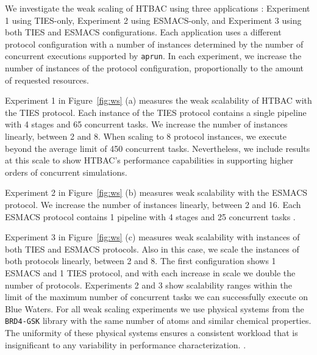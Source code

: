 We investigate the weak scaling of HTBAC using three
applications : Experiment 
1 using TIES-only, Experiment 2 using ESMACS-only, and Experiment 3 using
both TIES and ESMACS configurations. Each application uses a different protocol 
configuration with a number of instances determined by the 
number of concurrent executions supported by \texttt{aprun}. In each experiment, 
we increase the number of instances of the protocol configuration, 
proportionally to the amount of requested resources. 

Experiment 1 in Figure~\ref{fig:ws} (a) measures the weak scalability of HTBAC 
with the TIES protocol. Each instance of the TIES protocol contains a single 
pipeline with 4 stages and 65 concurrent tasks. We increase the number of 
instances linearly, between 2 and 8. When scaling to 8 protocol instances, we 
execute beyond the average limit of 450 concurrent tasks. 
Nevertheless, we include results at this scale to show HTBAC's performance 
capabilities in supporting higher orders of concurrent simulations. 

Experiment 2 in Figure~\ref{fig:ws} (b) measures weak scalability with the 
ESMACS protocol. We increase the number of instances linearly, between 2 and 16. 
Each ESMACS protocol contains 1 pipeline with 4 stages and 25
concurrent tasks . 

Experiment 3 in Figure~\ref{fig:ws} (c) measures weak scalability
with instances of both TIES and ESMACS protocols. Also in this case, we scale
the instances of both protocols linearly, between 2 and 8. The first 
configuration shows 1 ESMACS and 1 TIES protocol, and with each increase in 
scale we double the number of protocols. Experiments 2 and 3 
show scalability ranges within the limit of the maximum number of concurrent 
tasks we can successfully execute on Blue Waters. For all weak
scaling experiments we use  physical systems from the \texttt{BRD4-GSK} library with the same 
number of atoms and similar chemical properties. The uniformity of these 
physical systems ensures a consistent workload that is insignificant to any 
variability in performance characterization. 
.

